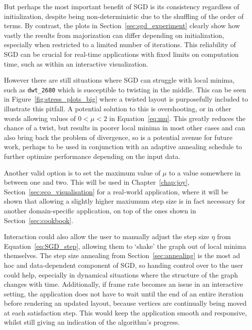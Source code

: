 But perhaps the most important benefit of SGD is its consistency regardless of initialization, despite being non-deterministic due to the shuffling of the order of terms. By contrast, the plots in Section~\ref{sec:sgd_experiment} clearly show how vastly the results from majorization can differ depending on initialization, especially when restricted to a limited number of iterations. This reliability of SGD can be crucial for real-time applications with fixed limits on computation time, such as within an interactive visualization.

However there are still situations where SGD can struggle with local minima, such as \texttt{dwt\_2680} which is susceptible to twisting in the middle. This can be seen in Figure~\ref{fig:stress_plots_big} where a twisted layout is purposefully included to illustrate this pitfall.
A potential solution to this is overshooting, or in other words allowing values of $0 < \mu < 2$ in Equation~\eqref{eq:mu}. This greatly reduces the chance of a twist, but results in poorer local minima in most other cases and can also bring back the problem of divergence, so is a potential avenue for future work,
perhaps to be used in conjunction with an adaptive annealing schedule to further optimize performance depending on the input data.

Another valid option is to set the maximum value of $\mu$ to a value somewhere in between one and two. This will be used in Chapter~\ref{chap:joy}, Section~\ref{sec:eco_visualisation} for a real-world application, where it will be shown that allowing a slightly higher maxiumum step size is in fact necessary for another domain-specific application, on top of the ones shown in Section~\ref{sec:cookbook}.

Interaction could also allow the user to manually adjust the step size $\eta$ from Equation~\eqref{eq:SGD_step}, allowing them to `shake' the graph out of local minima themselves. The step size annealing from Section~\ref{sec:annealing} is the most ad hoc and data-dependent component of SGD, so handing control over to the user could help, especially in dynamical situations where the structure of the graph changes with time.
Additionally, if frame rate becomes an issue in an interactive setting, the application does not have to wait until the end of an entire iteration before rendering an updated layout, because vertices are continually being moved at each satisfaction step. This would keep the application smooth and responsive, whilst still giving an indication of the algorithm's progress.

